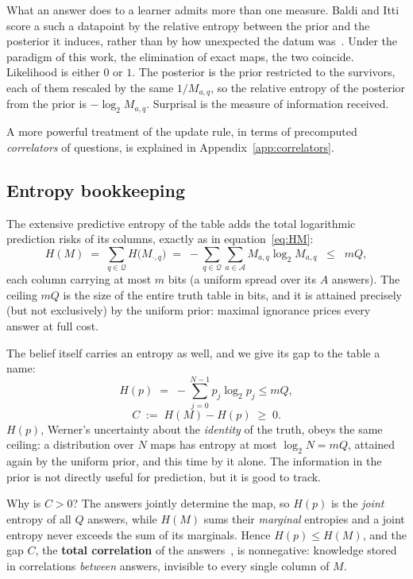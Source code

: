 \documentclass[11pt]{article}
\begin{document}
What an answer does to a learner admits more than one measure. Baldi and
Itti score a such a datapoint by the relative entropy between the prior and the
posterior it induces, rather than by how unexpected the datum
was~\cite{baldiitti10}. Under the paradigm of this work, the elimination
of exact maps, the two coincide. Likelihood is either $0$ or $1$. The posterior is the prior restricted to
the survivors, each of them rescaled by the same $1/M_{a,q}$, so the
relative entropy of the posterior from the prior is $-\log_2 M_{a,q}$.
Surprisal is the measure of information received.

A more powerful treatment of the update rule, in terms of precomputed \emph{correlators} of questions, 
is explained in Appendix~\ref{app:correlators}.

\subsection{Entropy bookkeeping}\label{sec:bookkeeping}

The extensive predictive entropy of the table adds the total logarithmic
prediction risks of its columns, exactly as in equation~\eqref{eq:HM}:
\begin{equation}\label{eq:HM-general}
  H(M) \;=\; \sum_{q \in \mathcal Q} H\big(M_{\cdot,q}\big)
  \;=\; -\sum_{q \in \mathcal Q} \sum_{a \in \mathcal A} M_{a,q} \log_2 M_{a,q}
  \;\;\leq\;\; mQ,
\end{equation}
each column carrying at most $m$ bits (a uniform spread over its
$A$ answers). The ceiling $mQ$ is the size of the entire truth
table in bits, and it is attained precisely (but not exclusively) by the uniform prior:
maximal ignorance prices every answer at full cost.

The belief itself carries an entropy as well, and we give its gap to
the table a name:
\begin{equation}
  H(p) \;=\; -\sum_{j=0}^{N-1} p_j \log_2 p_j \leq mQ,
\end{equation}
\begin{equation}\label{eq:C}
  C \;:=\; H(M) - H(p) \;\geq\; 0.
\end{equation}
$H(p)$, Werner's uncertainty about the \emph{identity} of the truth,
obeys the same ceiling: a distribution over $N$ maps has entropy at
most $\log_2 N = mQ$, attained again by the uniform prior, and this time
by it alone. The information in the
prior is not directly useful for prediction, but it is good to track. 

Why is $C>0$? The answers jointly determine the map, so $H(p)$ is the
\emph{joint} entropy of all $Q$ answers, while $H(M)$ sums their
\emph{marginal} entropies and a joint entropy never exceeds the
sum of its marginals. Hence $H(p) \leq H(M)$, and the gap $C$, the
\textbf{total correlation} of the answers~\cite{watanabe60}, is nonnegative: knowledge
stored in correlations \emph{between} answers, invisible to every
single column of $M$.
\end{document}
